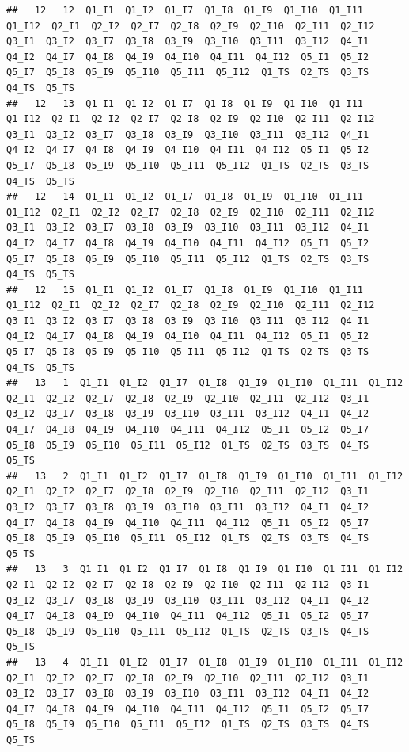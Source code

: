 \documentclass[]{book}
\begin{document}
\begin{verbatim}
##   12   12  Q1_I1  Q1_I2  Q1_I7  Q1_I8  Q1_I9  Q1_I10  Q1_I11  Q1_I12  Q2_I1  Q2_I2  Q2_I7  Q2_I8  Q2_I9  Q2_I10  Q2_I11  Q2_I12  Q3_I1  Q3_I2  Q3_I7  Q3_I8  Q3_I9  Q3_I10  Q3_I11  Q3_I12  Q4_I1  Q4_I2  Q4_I7  Q4_I8  Q4_I9  Q4_I10  Q4_I11  Q4_I12  Q5_I1  Q5_I2  Q5_I7  Q5_I8  Q5_I9  Q5_I10  Q5_I11  Q5_I12  Q1_TS  Q2_TS  Q3_TS  Q4_TS  Q5_TS
##   12   13  Q1_I1  Q1_I2  Q1_I7  Q1_I8  Q1_I9  Q1_I10  Q1_I11  Q1_I12  Q2_I1  Q2_I2  Q2_I7  Q2_I8  Q2_I9  Q2_I10  Q2_I11  Q2_I12  Q3_I1  Q3_I2  Q3_I7  Q3_I8  Q3_I9  Q3_I10  Q3_I11  Q3_I12  Q4_I1  Q4_I2  Q4_I7  Q4_I8  Q4_I9  Q4_I10  Q4_I11  Q4_I12  Q5_I1  Q5_I2  Q5_I7  Q5_I8  Q5_I9  Q5_I10  Q5_I11  Q5_I12  Q1_TS  Q2_TS  Q3_TS  Q4_TS  Q5_TS
##   12   14  Q1_I1  Q1_I2  Q1_I7  Q1_I8  Q1_I9  Q1_I10  Q1_I11  Q1_I12  Q2_I1  Q2_I2  Q2_I7  Q2_I8  Q2_I9  Q2_I10  Q2_I11  Q2_I12  Q3_I1  Q3_I2  Q3_I7  Q3_I8  Q3_I9  Q3_I10  Q3_I11  Q3_I12  Q4_I1  Q4_I2  Q4_I7  Q4_I8  Q4_I9  Q4_I10  Q4_I11  Q4_I12  Q5_I1  Q5_I2  Q5_I7  Q5_I8  Q5_I9  Q5_I10  Q5_I11  Q5_I12  Q1_TS  Q2_TS  Q3_TS  Q4_TS  Q5_TS
##   12   15  Q1_I1  Q1_I2  Q1_I7  Q1_I8  Q1_I9  Q1_I10  Q1_I11  Q1_I12  Q2_I1  Q2_I2  Q2_I7  Q2_I8  Q2_I9  Q2_I10  Q2_I11  Q2_I12  Q3_I1  Q3_I2  Q3_I7  Q3_I8  Q3_I9  Q3_I10  Q3_I11  Q3_I12  Q4_I1  Q4_I2  Q4_I7  Q4_I8  Q4_I9  Q4_I10  Q4_I11  Q4_I12  Q5_I1  Q5_I2  Q5_I7  Q5_I8  Q5_I9  Q5_I10  Q5_I11  Q5_I12  Q1_TS  Q2_TS  Q3_TS  Q4_TS  Q5_TS
##   13   1  Q1_I1  Q1_I2  Q1_I7  Q1_I8  Q1_I9  Q1_I10  Q1_I11  Q1_I12  Q2_I1  Q2_I2  Q2_I7  Q2_I8  Q2_I9  Q2_I10  Q2_I11  Q2_I12  Q3_I1  Q3_I2  Q3_I7  Q3_I8  Q3_I9  Q3_I10  Q3_I11  Q3_I12  Q4_I1  Q4_I2  Q4_I7  Q4_I8  Q4_I9  Q4_I10  Q4_I11  Q4_I12  Q5_I1  Q5_I2  Q5_I7  Q5_I8  Q5_I9  Q5_I10  Q5_I11  Q5_I12  Q1_TS  Q2_TS  Q3_TS  Q4_TS  Q5_TS
##   13   2  Q1_I1  Q1_I2  Q1_I7  Q1_I8  Q1_I9  Q1_I10  Q1_I11  Q1_I12  Q2_I1  Q2_I2  Q2_I7  Q2_I8  Q2_I9  Q2_I10  Q2_I11  Q2_I12  Q3_I1  Q3_I2  Q3_I7  Q3_I8  Q3_I9  Q3_I10  Q3_I11  Q3_I12  Q4_I1  Q4_I2  Q4_I7  Q4_I8  Q4_I9  Q4_I10  Q4_I11  Q4_I12  Q5_I1  Q5_I2  Q5_I7  Q5_I8  Q5_I9  Q5_I10  Q5_I11  Q5_I12  Q1_TS  Q2_TS  Q3_TS  Q4_TS  Q5_TS
##   13   3  Q1_I1  Q1_I2  Q1_I7  Q1_I8  Q1_I9  Q1_I10  Q1_I11  Q1_I12  Q2_I1  Q2_I2  Q2_I7  Q2_I8  Q2_I9  Q2_I10  Q2_I11  Q2_I12  Q3_I1  Q3_I2  Q3_I7  Q3_I8  Q3_I9  Q3_I10  Q3_I11  Q3_I12  Q4_I1  Q4_I2  Q4_I7  Q4_I8  Q4_I9  Q4_I10  Q4_I11  Q4_I12  Q5_I1  Q5_I2  Q5_I7  Q5_I8  Q5_I9  Q5_I10  Q5_I11  Q5_I12  Q1_TS  Q2_TS  Q3_TS  Q4_TS  Q5_TS
##   13   4  Q1_I1  Q1_I2  Q1_I7  Q1_I8  Q1_I9  Q1_I10  Q1_I11  Q1_I12  Q2_I1  Q2_I2  Q2_I7  Q2_I8  Q2_I9  Q2_I10  Q2_I11  Q2_I12  Q3_I1  Q3_I2  Q3_I7  Q3_I8  Q3_I9  Q3_I10  Q3_I11  Q3_I12  Q4_I1  Q4_I2  Q4_I7  Q4_I8  Q4_I9  Q4_I10  Q4_I11  Q4_I12  Q5_I1  Q5_I2  Q5_I7  Q5_I8  Q5_I9  Q5_I10  Q5_I11  Q5_I12  Q1_TS  Q2_TS  Q3_TS  Q4_TS  Q5_TS

\end{verbatim}
\end{document}
